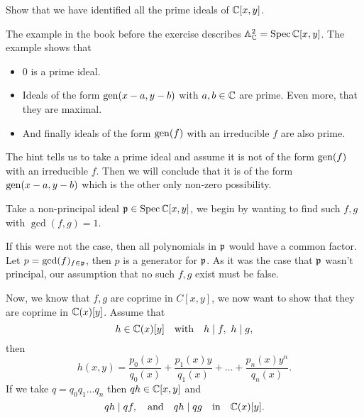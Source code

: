\documentclass[12pt]{memoir}
\begin{document}

\begin{Ej}[3.2.E Vakil]
    Show that we have identified all the prime ideals of $\mathbb{C}[x,y]$.\par
\end{Ej}

The example in the book before the exercise describes $\mathbb{A}^2_{\mathbb{C}}=\operatorname{Spec}\mathbb{C}[x,y]$. The example shows that 
\begin{itemize}
    \itemsep=-0.4em
    \item $0$ is a prime ideal. 
    \item Ideals of the form $\operatorname{gen}(x-a,y-b)$ with $a,b\in\mathbb{C}$ are prime. Even more, that they are maximal. 
    \item And finally ideals of the form $\operatorname{gen}(f)$ with an irreducible $f$ are also prime.
\end{itemize}

The hint tells us to take a prime ideal and assume it is not of the form $\operatorname{gen}(f)$ with an irreducible $f$. Then we will conclude that it is of the form $\operatorname{gen}(x-a,y-b)$ which is the other only non-zero possibility.
\begin{ptcbr}
Take a non-principal ideal $\mathfrak{p}\in\operatorname{Spec}\mathbb{C}[x,y]$, we begin by wanting to find such $f,g$ with $\gcd(f,g)=1$.\par
If this were not the case, then all polynomials in $\mathfrak{p}$ would have a common factor. Let $p=\gcd(f)_{f\in\mathfrak{p}}$, then $p$ is a generator for $\mathfrak{p}$. As it was the case that $\mathfrak{p}$ wasn't principal, our assumption that no such $f,g$ exist must be false.\par 
Now, we know that $f,g$ are coprime in $C[x,y]$, we now want to show that they are coprime in $\mathbb{C}(x)[y]$. Assume that
 $$h\in\bC(x)[y]\word{with}h\mid f,\ h\mid g,$$
then 
$$h(x,y)=\frac{p_0(x)}{q_0(x)}+\frac{p_1(x)y}{q_1(x)}+\dots+\frac{p_n(x)y^n}{q_n(x)}.$$
If we take $q=q_0q_1\dots q_n$ then $qh\in\mathbb{C}[x,y]$ and 
$$qh\mid qf,\word{and}qh\mid qg\word{in}\bC(x)[y].$$

\end{ptcbr}
    
\end{document}
